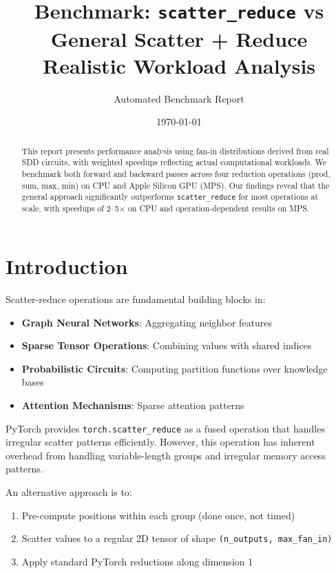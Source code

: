 \documentclass[11pt]{article}
\title{Benchmark: \texttt{scatter\_reduce} vs General Scatter + Reduce\\Realistic Workload Analysis}
\author{Automated Benchmark Report}
\date{\today}
\begin{document}
\maketitle

\begin{abstract}
This report presents performance analysis using fan-in distributions derived from real SDD circuits, with weighted speedups reflecting actual computational workloads. We benchmark both forward and backward passes across four reduction operations (prod, sum, max, min) on CPU and Apple Silicon GPU (MPS). Our findings reveal that the general approach significantly outperforms \texttt{scatter\_reduce} for most operations at scale, with speedups of 2--5$\times$ on CPU and operation-dependent results on MPS.
\end{abstract}

\section{Introduction}

Scatter-reduce operations are fundamental building blocks in:
\begin{itemize}
    \item \textbf{Graph Neural Networks}: Aggregating neighbor features
    \item \textbf{Sparse Tensor Operations}: Combining values with shared indices
    \item \textbf{Probabilistic Circuits}: Computing partition functions over knowledge bases
    \item \textbf{Attention Mechanisms}: Sparse attention patterns
\end{itemize}

PyTorch provides \texttt{torch.scatter\_reduce} as a fused operation that handles irregular scatter patterns efficiently. However, this operation has inherent overhead from handling variable-length groups and irregular memory access patterns.

An alternative approach is to:
\begin{enumerate}
    \item Pre-compute positions within each group (done once, not timed)
    \item Scatter values to a regular 2D tensor of shape \texttt{(n\_outputs, max\_fan\_in)}
    \item Apply standard PyTorch reductions along dimension 1
\end{enumerate}
\end{document}
